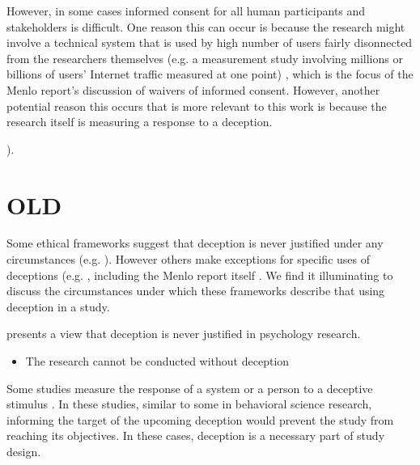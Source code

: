 However, in some cases informed consent for all human participants and stakeholders is difficult.  One reason this can occur is because the research might involve a technical system that is used by high number of users fairly disonnected from the researchers themselves (e.g. a measurement study involving millions or billions of users' Internet traffic measured at one point) \cite{partridgeEthicalConsiderationsNetwork2016}, which is the focus of the Menlo report's discussion of waivers of informed consent.
However, another potential reason this occurs that is more relevant to this work is because the research itself is measuring a response to a deception.




\cite{narayananNoEncoreEncore2015,jakobssonWhyHowPerform2008,partridgeEthicalConsiderationsNetwork2016,wendlerDeceptionPursuitScience2004,kelmanHumanUseHuman1978,cranorConferenceSubmissionReview,finnEthicsGovernanceDevelopment2023,kohnoEthicalFrameworksComputer}). 
\section{OLD}



Some ethical frameworks suggest that deception is never justified under any circumstances (e.g. \cite{baumrindResearchUsingIntentional1985,meadResearchHumanBeings}).
However others make exceptions for specific uses of deceptions (e.g. \cite{wendlerDeceptionPursuitScience2004,belmontReport}, including the Menlo report itself \cite{menloReport}.  We find it illuminating to discuss the circumstances under which these frameworks describe that using deception in a study.


\cite{} presents a view that deception is never justified in psychology research.


\begin{itemize}
\item The research cannot be conducted without deception \cite{}
\end{itemize}

Some studies measure the response of a system or a person to a deceptive stimulus .  In these studies, similar to some in behavioral science research, informing the target of the upcoming deception would prevent the study from reaching its objectives.  In these cases, deception is a necessary part of study design. 


